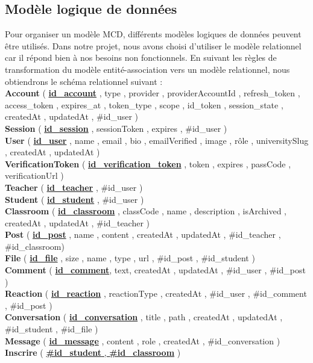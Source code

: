 \subsection{Modèle logique de données}
Pour organiser un modèle MCD, différents modèles logiques de données peuvent être utilisés. Dans notre projet, nous avons choisi d'utiliser le modèle relationnel car il répond bien à nos besoins non fonctionnels. En suivant les règles de transformation du modèle entité-association vers un modèle relationnel, nous obtiendrons le schéma relationnel suivant : \\
\textbf{Account} ( \textbf{\uline{id\_account}} , type , provider , providerAccountId , refresh\_token , access\_token , expires\_at , token\_type , scope , id\_token , session\_state , createdAt , updatedAt , \#id\_user ) \\
\textbf{Session} ( \textbf{\uline{id\_session}} , sessionToken , expires , \#id\_user ) \\ 
\textbf{User} ( \textbf{\uline{id\_user}} , name , email , bio , emailVerified , image , rôle , universitySlug , createdAt , updatedAt ) \\
\textbf{VerificationToken} ( \textbf{\uline{id\_verification\_token}} , token , expires , passCode , verificationUrl ) \\
\textbf{Teacher} ( \textbf{\uline{id\_teacher}} , \#id\_user ) \\
\textbf{Student} ( \textbf{\uline{id\_student}} , \#id\_user ) \\
\textbf{Classroom} ( \textbf{\uline{id\_classroom}} , classCode , name , description , isArchived , createdAt , updatedAt , \#id\_teacher ) \\
\textbf{Post} ( \textbf{\uline{id\_post}} , name , content , createdAt , updatedAt , \#id\_teacher , \#id\_classroom) \\
\textbf{File} ( \textbf{\uline{id\_file}} , size , name , type , url , \#id\_post , \#id\_student ) \\
\textbf{Comment} ( \textbf{\uline{id\_comment}}, text, createdAt , updatedAt , \#id\_user , \#id\_post ) \\
\textbf{Reaction} ( \textbf{\uline{id\_reaction}} , reactionType , createdAt , \#id\_user , \#id\_comment , \#id\_post ) \\
\textbf{Conversation} ( \textbf{\uline{id\_conversation}} , title , path , createdAt , updatedAt , \#id\_student , \#id\_file ) \\
\textbf{Message} ( \textbf{\uline{id\_message}} , content , role , createdAt , \#id\_conversation ) \\
\textbf{Inscrire} ( \uline{\textbf{\#id\_student} , \textbf{\#id\_classroom}} )

